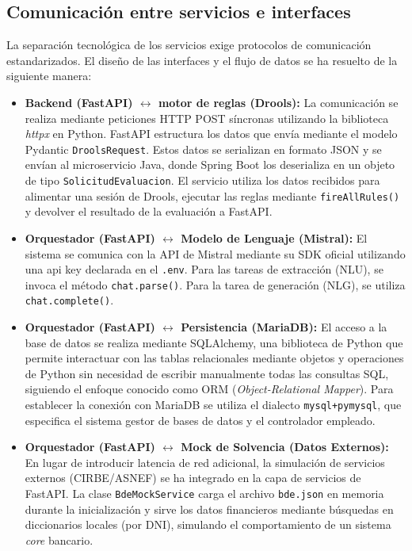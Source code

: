 \documentclass[12pt,a4paper]{report}
\begin{document}
\subsection{Comunicación entre servicios e interfaces}

La separación tecnológica de los servicios exige protocolos de comunicación estandarizados. El diseño de las interfaces y el flujo de datos se ha resuelto de la siguiente manera:
\begin{itemize}
    \item \textbf{Backend (FastAPI) $\leftrightarrow$ motor de reglas (Drools):} La comunicación se realiza mediante peticiones HTTP POST síncronas utilizando la biblioteca \textit{httpx} en Python. FastAPI estructura los datos que envía mediante el modelo Pydantic \texttt{DroolsRequest}. Estos datos se serializan en formato JSON y se envían al microservicio Java, donde Spring Boot los deserializa en un objeto de tipo \texttt{SolicitudEvaluacion}. El servicio utiliza los datos recibidos para alimentar una sesión de Drools, ejecutar las reglas mediante \texttt{fireAllRules()} y devolver el resultado de la evaluación a FastAPI.
    \item \textbf{Orquestador (FastAPI) $\leftrightarrow$ Modelo de Lenguaje (Mistral):} El sistema se comunica con la API de Mistral mediante su SDK oficial utilizando una api key declarada en el \texttt{.env}. Para las tareas de extracción (NLU), se invoca el método \texttt{chat.parse()}. Para la tarea de generación (NLG), se utiliza \texttt{chat.complete()}.
    \item \textbf{Orquestador (FastAPI) $\leftrightarrow$ Persistencia (MariaDB):} El acceso a la base de datos se realiza mediante SQLAlchemy, una biblioteca de Python que permite interactuar con las tablas relacionales mediante objetos y operaciones de Python sin necesidad de escribir manualmente todas las consultas SQL, siguiendo el enfoque conocido como ORM (\textit{Object-Relational Mapper}). Para establecer la conexión con MariaDB se utiliza el dialecto \texttt{mysql+pymysql}, que especifica el sistema gestor de bases de datos y el controlador empleado.
    \item \textbf{Orquestador (FastAPI) $\leftrightarrow$ Mock de Solvencia (Datos Externos):} En lugar de introducir latencia de red adicional, la simulación de servicios externos (CIRBE/ASNEF) se ha integrado en la capa de servicios de FastAPI. La clase \texttt{BdeMockService} carga el archivo \texttt{bde.json} en memoria durante la inicialización y sirve los datos financieros mediante búsquedas en diccionarios locales (por DNI), simulando el comportamiento de un sistema \textit{core} bancario.
\end{itemize}
\end{document}
